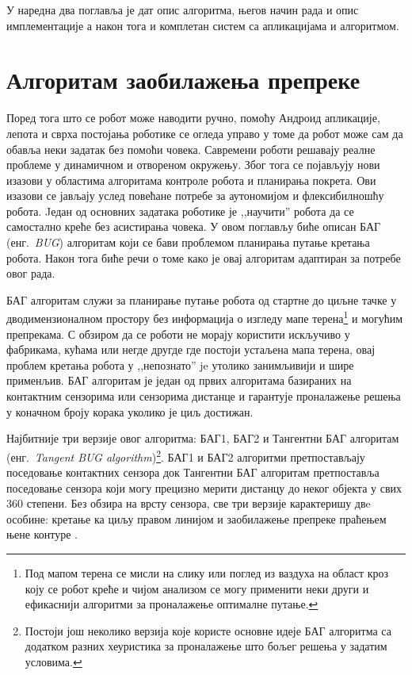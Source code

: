 \documentclass[12pt,oneside]{memoir}
\theoremstyle{remark}
\begin{document}
У наредна два поглавља је дат опис алгоритма, његов начин рада и опис имплементације а након тога и комплетан систем са апликацијама и алгоритмом.

\chapter{Алгоритам заобилажења препреке}
\label{chp:algoritam}
Поред тога што се робот може наводити ручно, помоћу Андроид апликације, лепота и сврха постојања роботике се огледа управо у томе да робот може сам да обавља неки задатак без помоћи човека. Савремени роботи решавају реалне проблеме у динамичном и отвореном окружењу. Због тога се појављују нови изазови у областима алгоритама контроле робота и планирања покрета. Ови изазови се јављају услед повећане потребе за аутономијом и флексибилношћу робота. Jедан од основних задатака роботике је ,,научити'' робота да се самостално креће без асистирања човека. У овом поглављу биће описан БАГ (енг.~{\em BUG}) алгоритам који се бави проблемом планирања путање кретања робота. Након тога биће речи о томе како је овај алгоритам адаптиран за потребе овог рада.

БАГ алгоритам служи за планирање путање робота од стартне до циљне тачке у дводимензионалном простору без информација о изгледу мапе терена\footnote{Под мапом терена се мисли на слику или поглед из ваздуха на област кроз коју се робот креће и чијом анализом се могу применити неки други и ефикаснији алгоритми за проналажење оптималне путање.} и могућим препрекама. С обзиром да се роботи не морају користити искључиво у фабрикама, кућама или негде другде где постоји устаљена мапа терена, овај проблем кретања робота у ,,непознато'' je утолико занимљивији и шире применљив. БАГ алгоритам је један од првих алгоритама  базираних на контактним сензорима или сензорима дистанце и гарантује проналажење решења у коначном броју корака уколико је циљ достижан. 

Најбитније три верзије овог алгоритма: БАГ1, БАГ2 и Тангентни БАГ алгоритам (енг.~{\em Tangent BUG algorithm})\footnote{Постоји још неколико верзија које користе основне идеје БАГ алгоритма са додатком разних хеуристика за проналажење што бољег решења у задатим условима.}. БАГ1 и БАГ2 алгоритми претпостављају поседовање контактних сензора док Тангентни БАГ алгоритам претпоставља поседовање сензора који могу прецизно мерити дистанцу до неког објекта у свих 360 степени. Без обзира на врсту сензора, све три верзије карактеришу двe особине: кретање ка циљу правом линијом и заобилажење препреке праћењем њене контуре \cite{principlesofrobotmotion}. 
\end{document}
